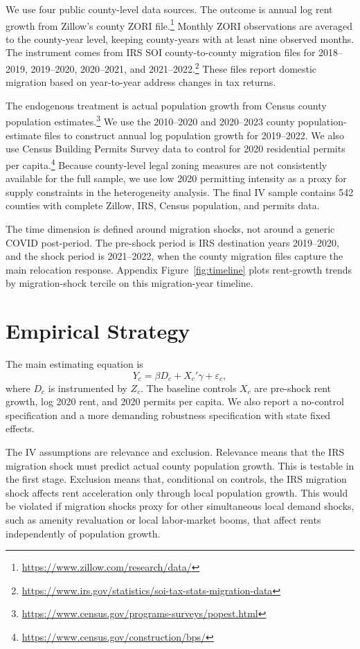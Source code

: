 \documentclass[11pt]{article}
\begin{document}
We use four public county-level data sources. The outcome is annual log rent growth from Zillow's county ZORI file.\footnote{\url{https://www.zillow.com/research/data/}} Monthly ZORI observations are averaged to the county-year level, keeping county-years with at least nine observed months. The instrument comes from IRS SOI county-to-county migration files for 2018--2019, 2019--2020, 2020--2021, and 2021--2022.\footnote{\url{https://www.irs.gov/statistics/soi-tax-stats-migration-data}} These files report domestic migration based on year-to-year address changes in tax returns.

The endogenous treatment is actual population growth from Census county population estimates.\footnote{\url{https://www.census.gov/programs-surveys/popest.html}} We use the 2010--2020 and 2020--2023 county population-estimate files to construct annual log population growth for 2019--2022. We also use Census Building Permits Survey data to control for 2020 residential permits per capita.\footnote{\url{https://www.census.gov/construction/bps/}} Because county-level legal zoning measures are not consistently available for the full sample, we use low 2020 permitting intensity as a proxy for supply constraints in the heterogeneity analysis. The final IV sample contains 542 counties with complete Zillow, IRS, Census population, and permits data.

The time dimension is defined around migration shocks, not around a generic COVID post-period. The pre-shock period is IRS destination years 2019--2020, and the shock period is 2021--2022, when the county migration files capture the main relocation response. Appendix Figure~\ref{fig:timeline} plots rent-growth trends by migration-shock tercile on this migration-year timeline.

\section{Empirical Strategy}

The main estimating equation is
\[
Y_c = \beta D_c + X_c'\gamma + \varepsilon_c,
\]
where $D_c$ is instrumented by $Z_c$. The baseline controls $X_c$ are pre-shock rent growth, log 2020 rent, and 2020 permits per capita. We also report a no-control specification and a more demanding robustness specification with state fixed effects.

The IV assumptions are relevance and exclusion. Relevance means that the IRS migration shock must predict actual county population growth. This is testable in the first stage. Exclusion means that, conditional on controls, the IRS migration shock affects rent acceleration only through local population growth. This would be violated if migration shocks proxy for other simultaneous local demand shocks, such as amenity revaluation or local labor-market booms, that affect rents independently of population growth.
\end{document}
